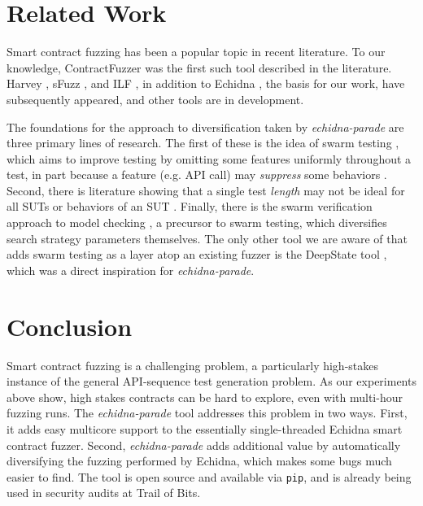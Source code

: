 \documentclass[sigconf]{acmart}
\begin{document}
{\section{Related Work}

Smart contract fuzzing has been a popular topic in recent literature.  To our knowledge, ContractFuzzer \cite{jiang:ase:2018} was the first such tool described in the literature.  Harvey \cite{harvey}, sFuzz \cite{sfuzz}, and ILF \cite{he2019learning}, in addition to Echidna \cite{echidnaissta}, the basis for our work, have subsequently appeared, and other tools are in development.

The foundations for the approach to diversification taken by \emph{echidna-parade} are three primary lines of research.  The first of these is the idea of swarm testing \cite{ISSTA12}, which aims to improve testing by omitting some features uniformly throughout a test, in part because a feature (e.g. API call) may \emph{suppress} some behaviors \cite{groce2013help}.   Second, there is literature showing that a single test \emph{length} may not be ideal for all SUTs or behaviors of an SUT \cite{ASE08,ArcuriLen}.  Finally, there is the swarm verification approach to model checking \cite{swarmIEEE}, a precursor to swarm testing, which diversifies search strategy parameters themselves.  The only other tool we are aware of that adds swarm testing as a layer atop an existing fuzzer is the DeepState tool \cite{goodman2018deepstate}, which was a direct inspiration for \emph{echidna-parade}.

\section{Conclusion}

Smart contract fuzzing is a challenging problem, a particularly high-stakes instance of the general API-sequence test generation problem.  As our experiments above show, high stakes contracts can be hard to explore, even with multi-hour fuzzing runs.  The \emph{echidna-parade} tool addresses this problem in two ways.  First, it adds easy multicore support to the essentially single-threaded Echidna smart contract fuzzer.  Second, \emph{echidna-parade} adds additional value by automatically diversifying the fuzzing performed by Echidna, which makes some bugs much easier to find.  The tool is open source and available via {\tt pip}, and is already being used in security audits at Trail of Bits.




}
\end{document}
